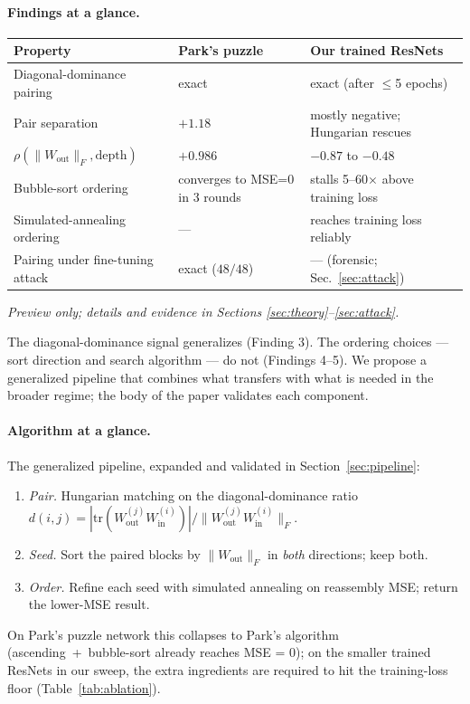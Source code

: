 \documentclass[10pt]{article}
\theoremstyle{remark}
\begin{document}
\paragraph{Findings at a glance.}

\begin{center}
\renewcommand{\arraystretch}{1.15}
\begin{tabular}{lll}
\toprule
Property & Park's puzzle & Our trained ResNets \\
\midrule
Diagonal-dominance pairing & exact & exact (after $\leq$5 epochs) \\
Pair separation & $+1.18$ & mostly negative; Hungarian rescues \\
$\rho(\|W_{\mathrm{out}}\|_F, \text{depth})$ & $+0.986$ & $-0.87$ to $-0.48$ \\
Bubble-sort ordering & converges to MSE=0 in 3 rounds & stalls 5--60$\times$ above training loss \\
Simulated-annealing ordering & --- & reaches training loss reliably \\
Pairing under fine-tuning attack & exact ($48/48$) & --- (forensic; Sec.~\ref{sec:attack}) \\
\bottomrule
\end{tabular}
\end{center}
\noindent\textit{\small Preview only; details and evidence in Sections \ref{sec:theory}--\ref{sec:attack}.}

The diagonal-dominance signal generalizes (Finding 3). The
ordering choices --- sort direction and search algorithm --- do not
(Findings 4--5). We propose a generalized pipeline that combines what
transfers with what is needed in the broader regime; the body of the
paper validates each component.

\paragraph{Algorithm at a glance.} The generalized pipeline, expanded
and validated in Section~\ref{sec:pipeline}:
\begin{enumerate}[leftmargin=*,itemsep=0pt,topsep=2pt]
  \item \emph{Pair.} Hungarian matching on the diagonal-dominance ratio
        $d(i,j)=|\mathrm{tr}(W_{\mathrm{out}}^{(j)} W_{\mathrm{in}}^{(i)})|/
        \|W_{\mathrm{out}}^{(j)} W_{\mathrm{in}}^{(i)}\|_F$.
  \item \emph{Seed.} Sort the paired blocks by $\|W_{\mathrm{out}}\|_F$
        in \emph{both} directions; keep both.
  \item \emph{Order.} Refine each seed with simulated annealing on
        reassembly MSE; return the lower-MSE result.
\end{enumerate}
On Park's puzzle network this collapses to Park's algorithm
(ascending~+~bubble-sort already reaches MSE = 0); on the smaller
trained ResNets in our sweep, the extra ingredients are required to
hit the training-loss floor (Table~\ref{tab:ablation}).
\end{document}

